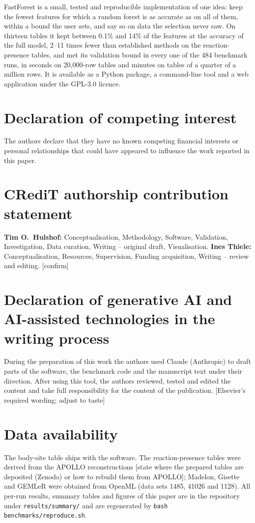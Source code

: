 \documentclass[11pt,a4paper]{article}
\newcommand{\authnote}[1]{{\color{notecolor}\small [#1]}}
\begin{document}
FastForest is a small, tested and reproducible implementation of one idea: keep the fewest features for which a random forest is as accurate as on all of them, within a bound the user sets, and say so on data the selection never saw. On thirteen tables it kept between 0.1\% and 14\% of the features at the accuracy of the full model, 2--11 times fewer than established methods on the reaction-presence tables, and met its validation bound in every one of the 484 benchmark runs, in seconds on 20,000-row tables and minutes on tables of a quarter of a million rows. It is available as a Python package, a command-line tool and a web application under the GPL-3.0 licence.

\section*{Declaration of competing interest}
The authors declare that they have no known competing financial interests or personal relationships that could have appeared to influence the work reported in this paper.

\section*{CRediT authorship contribution statement}
\textbf{Tim O.\ Hulshof:} Conceptualisation, Methodology, Software, Validation, Investigation, Data curation, Writing -- original draft, Visualisation. \textbf{Ines Thiele:} Conceptualisation, Resources, Supervision, Funding acquisition, Writing -- review and editing. \authnote{confirm}

\section*{Declaration of generative AI and AI-assisted technologies in the writing process}
During the preparation of this work the authors used Claude (Anthropic) to draft parts of the software, the benchmark code and the manuscript text under their direction. After using this tool, the authors reviewed, tested and edited the content and take full responsibility for the content of the publication. \authnote{Elsevier's required wording; adjust to taste}

\section*{Data availability}
The body-site table ships with the software. The reaction-presence tables were derived from the APOLLO reconstructions \cite{heinken2025} \authnote{state where the prepared tables are deposited (Zenodo) or how to rebuild them from APOLLO}; Madelon, Gisette and GEMLeR were obtained from OpenML (data sets 1485, 41026 and 1128). All per-run results, summary tables and figures of this paper are in the repository under \texttt{results/summary/} and are regenerated by \texttt{bash benchmarks/reproduce.sh}.
\end{document}
